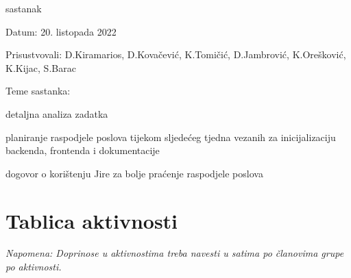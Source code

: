 \begin{packed_enum}
			\item  sastanak
			\item[] \begin{packed_item}
				\item Datum: 20. listopada 2022
				\item Prisustvovali: D.Kiramarios, D.Kovačević, K.Tomičić, D.Jambrović, K.Orešković, K.Kijac, S.Barac
				\item Teme sastanka:
				\begin{packed_item}
					\item  detaljna analiza zadatka
					\item  planiranje raspodjele poslova tijekom sljedećeg tjedna vezanih za inicijalizaciju backenda, frontenda i dokumentacije
					\item  dogovor o korištenju Jire za bolje praćenje raspodjele poslova
				\end{packed_item}
			\end{packed_item}
			
		\end{packed_enum}
		
		\eject
		\section*{Tablica aktivnosti}
		
			
			 \textit{Napomena: Doprinose u aktivnostima treba navesti u satima po članovima grupe po aktivnosti.}

